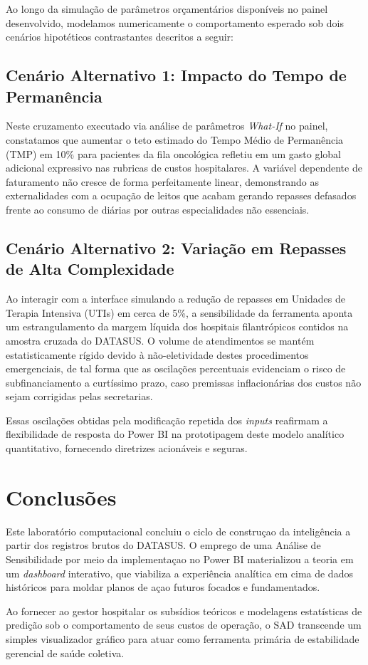 \documentclass[12pt]{article}
\begin{document}
Ao longo da simulação de parâmetros orçamentários disponíveis no painel desenvolvido, modelamos numericamente o comportamento esperado sob dois cenários hipotéticos contrastantes descritos a seguir:

\subsection{Cenário Alternativo 1: Impacto do Tempo de Permanência}
Neste cruzamento executado via análise de parâmetros \textit{What-If} no painel, constatamos que aumentar o teto estimado do Tempo Médio de Permanência (TMP) em 10\% para pacientes da fila oncológica refletiu em um gasto global adicional expressivo nas rubricas de custos hospitalares. A variável dependente de faturamento não cresce de forma perfeitamente linear, demonstrando as externalidades com a ocupação de leitos que acabam gerando repasses defasados frente ao consumo de diárias por outras especialidades não essenciais.

\subsection{Cenário Alternativo 2: Variação em Repasses de Alta Complexidade}
Ao interagir com a interface simulando a redução de repasses em Unidades de Terapia Intensiva (UTIs) em cerca de 5\%, a sensibilidade da ferramenta aponta um estrangulamento da margem líquida dos hospitais filantrópicos contidos na amostra cruzada do DATASUS. O volume de atendimentos se mantém estatisticamente rígido devido à não-eletividade destes procedimentos emergenciais, de tal forma que as oscilações percentuais evidenciam o risco de subfinanciamento a curtíssimo prazo, caso premissas inflacionárias dos custos não sejam corrigidas pelas secretarias.

Essas oscilações obtidas pela modificação repetida dos \textit{inputs} reafirmam a flexibilidade de resposta do Power BI na prototipagem deste modelo analítico quantitativo, fornecendo diretrizes acionáveis e seguras.

\section{Conclusões}
Este laboratório computacional concluiu o ciclo de construçao da inteligência a partir dos registros brutos do DATASUS. O emprego de uma Análise de Sensibilidade por meio da implementaçao no Power BI materializou a teoria em um \textit{dashboard} interativo, que viabiliza a experiência analítica em cima de dados históricos para moldar planos de açao futuros focados e fundamentados. 

Ao fornecer ao gestor hospitalar os subsídios teóricos e modelagens estatísticas de predição sob o comportamento de seus custos de operação, o SAD transcende um simples visualizador gráfico para atuar como ferramenta primária de estabilidade gerencial de saúde coletiva.



\end{document}
